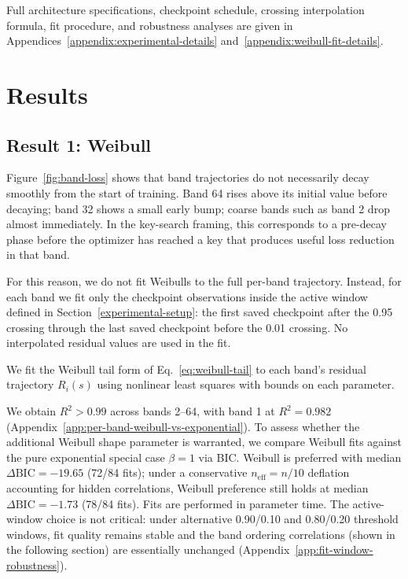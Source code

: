 \documentclass{article}
\begin{document}
Full architecture specifications, checkpoint schedule, crossing
interpolation formula, fit procedure, and robustness analyses are given
in Appendices~\ref{appendix:experimental-details} and~\ref{appendix:weibull-fit-details}.

\section{Results}\label{results}

\subsection{Result 1: Weibull}\label{result-1-weibull}

Figure~\ref{fig:band-loss} shows that band trajectories do not necessarily decay smoothly
from the start of training. Band 64 rises above its initial value before
decaying; band 32 shows a small early bump; coarse bands such as band 2
drop almost immediately. In the key-search framing, this corresponds to
a pre-decay phase before the optimizer has reached a key that produces
useful loss reduction in that band.

For this reason, we do not fit Weibulls to the full per-band trajectory.
Instead, for each band we fit only the checkpoint observations inside
the active window defined in Section~\ref{experimental-setup}: the first
saved checkpoint after the 0.95 crossing through the last saved
checkpoint before the 0.01 crossing. No interpolated residual values are
used in the fit.

We fit the Weibull tail form of Eq.~\eqref{eq:weibull-tail} to each band's residual
trajectory $R_i(s)$ using nonlinear least squares with
bounds on each parameter.

We obtain $R^2 > 0.99$ across bands 2--64, with band 1 at $R^2 = 0.982$ (Appendix~\ref{app:per-band-weibull-vs-exponential}). To assess whether the additional Weibull shape parameter
is warranted, we compare Weibull fits against the pure exponential special case
$\beta = 1$ via BIC. Weibull is preferred with median $\Delta\mathrm{BIC} = -19.65$ (72/84 fits);
under a conservative $n_{\mathrm{eff}} = n/10$ deflation accounting for hidden
correlations, Weibull preference still holds at median
$\Delta\mathrm{BIC} = -1.73$ (78/84 fits). Fits are performed in parameter
time. The active-window choice is not critical: under alternative
0.90/0.10 and 0.80/0.20 threshold windows, fit quality remains stable
and the band ordering correlations (shown in the following section) are essentially unchanged
(Appendix~\ref{app:fit-window-robustness}).
\end{document}

